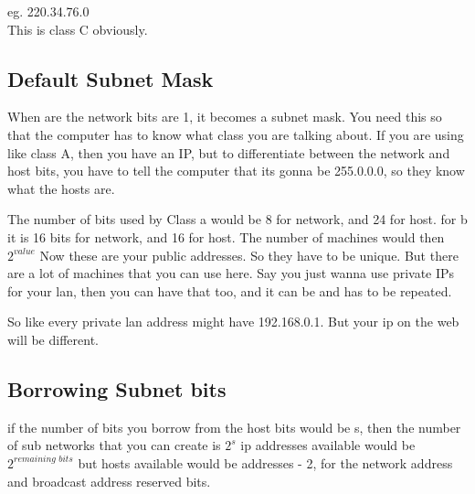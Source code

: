 \documentclass[11pt]{article}
\begin{document}
eg. 220.34.76.0\\ 
This is class C obviously. 

\subsection*{Default Subnet Mask}
When are the network bits are 1, it becomes a subnet mask. 
You need this so that the computer has to know what class you are talking about. If you are using like class A, then you have an IP, but to differentiate between the network and host bits, you have to tell the computer that its gonna be 255.0.0.0, so they know what the hosts are. 

The number of bits used by Class a would be 8 for network, and 24 for host. 
for b it is 16 bits for network, and 16 for host. The number of machines would then $2^{value}$
Now these are your public addresses. So they have to be unique. But there are a lot of machines that you can use here. Say you just wanna use private IPs for your lan, then you can have that too, and it can be and has to be repeated. 

So like every private lan address might have 192.168.0.1. But your ip on the web will be different. 

\subsection{Borrowing Subnet bits}

if the number of bits you borrow from the host bits would be s, then the number of sub networks that you can create is $2^s$
ip addresses available would be $2^\textit{remaining bits}$
but hosts available would be addresses - 2, for the network address and broadcast address reserved bits. 
\end{document}
